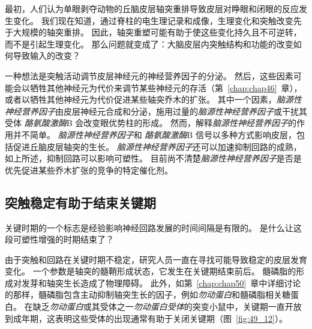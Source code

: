 最初，人们认为单眼剥夺动物的丘脑皮层轴突重排导致皮层对睁眼和闭眼的反应发生变化。
我们现在知道，通过脊柱的电生理记录和成像，生理变化和突触改变先于大规模的轴突重排。
因此，轴突重塑可能有助于使这些变化持久且不可逆转，而不是引起生理变化。
那么问题就变成了：大脑皮层内突触结构和功能的改变如何导致输入的改变？


一种想法是突触活动调节皮层神经元的神经营养因子的分泌。
然后，这些因素可能会以牺牲其他神经元为代价来调节某些神经元的存活（第~\ref{chap:chap46}~章），或者以牺牲其他神经元为代价促进某些轴突乔木的扩张。
其中一个因素，\textit{脑源性神经营养因子}由皮层神经元合成和分泌，施用过量的\textit{脑源性神经营养因子}或干扰其受体 \textit{酪氨酸激酶}B 会改变眼优势柱的形成。
然而，解释\textit{脑源性神经营养因子}的作用并不简单。
\textit{脑源性神经营养因子}和 \textit{酪氨酸激酶}B 信号以多种方式影响皮层，包括促进丘脑皮层轴突的生长。
\textit{脑源性神经营养因子}还可以加速抑制回路的成熟，如上所述，抑制回路可以影响可塑性。
目前尚不清楚\textit{脑源性神经营养因子}是否是优先促进某些乔木扩张的竞争的特定催化剂。



\subsection{突触稳定有助于结束关键期}

关键时期的一个标志是经验影响神经回路发展的时间间隔是有限的。 是什么让这段可塑性增强的时期结束了？


由于突触和回路在关键时期不稳定，研究人员一直在寻找可能导致稳定的皮层发育变化。
一个参数是轴突的髓鞘形成状态，它发生在关键期结束前后。
髓磷脂的形成对发芽和轴突生长造成了物理障碍。
此外，如第~\ref{chap:chap50}~章中详细讨论的那样，髓磷脂包含主动抑制轴突生长的因子，例如\textit{勿动蛋白}和髓磷脂相关糖蛋白。 
在缺乏\textit{勿动蛋白}或其受体之一\textit{勿动蛋白受体}的突变小鼠中，关键期一直开放到成年期，这表明这些受体的出现通常有助于关闭关键期（图~\ref{fig:49_12}）。


